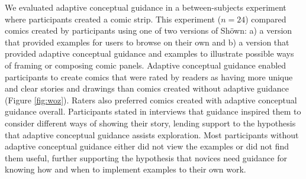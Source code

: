 We evaluated adaptive conceptual guidance in a between-subjects experiment where participants created a comic strip. This experiment ($n=24$) compared comics created by participants using one of two versions of Sh{\"o}wn:
a) a version that provided examples for users to browse on their own and b) a version that provided adaptive conceptual guidance and examples to illustrate possible ways of framing or composing comic panels. Adaptive conceptual guidance enabled participants to create comics that were rated by readers as having more unique and clear stories and drawings than comics created without adaptive guidance (Figure \ref{fig:woz}). Raters also preferred comics created with adaptive conceptual guidance overall. Participants stated in interviews that guidance inspired them to consider different ways of showing their story, lending support to the hypothesis that adaptive conceptual guidance assists exploration. Most participants without adaptive conceptual guidance either did not view the examples or did not find them useful, further supporting the hypothesis that novices need guidance for knowing how and when to implement examples to their own work. 

